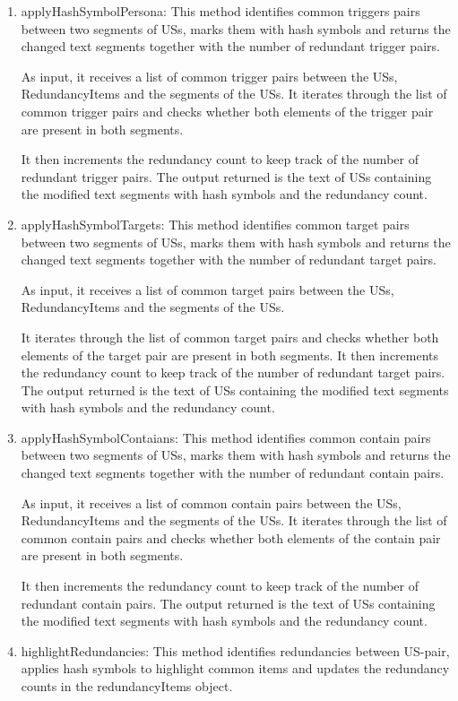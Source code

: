 \begin{enumerate}
	\item applyHashSymbolPersona: This method identifies common triggers pairs between two segments of USs, marks them with hash symbols and returns the changed text segments together with the number of redundant trigger pairs. 
	
	As input, it receives a list of common trigger pairs between the USs, RedundancyItems and the segments of the USs. It iterates through the list of common trigger pairs and checks whether both elements of the trigger pair are present in both segments. 
	
	It then increments the redundancy count to keep track of the number of redundant trigger pairs. The output returned is the text of USs containing the modified text segments with hash symbols and the redundancy count.
	
	\item applyHashSymbolTargets: This method identifies common target pairs between two segments of USs, marks them with hash symbols and returns the changed text segments together with the number of redundant target pairs.
	
	As input, it receives a list of common target pairs between the USs, RedundancyItems and the segments of the USs. 
	
	It iterates through the list of common target pairs and checks whether both elements of the target pair are present in both segments. It then increments the redundancy count to keep track of the number of redundant target pairs. The output returned is the text of USs containing the modified text segments with hash symbols and the redundancy count.
	
	\item applyHashSymbolContaians: This method identifies common contain pairs between two segments of USs, marks them with hash symbols and returns the changed text segments together with the number of redundant contain pairs. 
	
	As input, it receives a list of common contain pairs between the USs, RedundancyItems and the segments of the USs. It iterates through the list of common contain pairs and checks whether both elements of the contain pair are present in both segments. 
	
	It then increments the redundancy count to keep track of the number of redundant contain pairs. The output returned is the text of USs containing the modified text segments with hash symbols and the redundancy count.
	
	\item highlightRedundancies: This method identifies redundancies between US-pair, applies hash symbols to highlight common items and updates the redundancy counts in the redundancyItems object. 
	

\end{enumerate}
